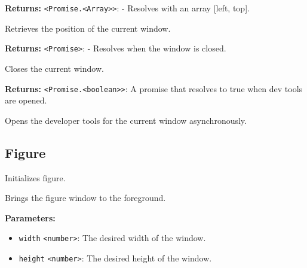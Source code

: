 \documentclass[12pt,a4paper]{article}
\begin{document}
\noindent \textbf{Returns:} \texttt{<Promise.<Array>>}: - Resolves with an array [left, top].

\noindent Retrieves the position of the current window.

\vspace{5mm}
\noindent {}


\noindent \textbf{Returns:} \texttt{<Promise>}: - Resolves when the window is closed.

\noindent Closes the current window.

\vspace{5mm}
\noindent {}


\noindent \textbf{Returns:} \texttt{<Promise.<boolean>>}: A promise that resolves to true when dev tools are opened.

\noindent Opens the developer tools for the current window asynchronously.


\subsection{Figure}
\vspace{5mm}
\noindent {}


\noindent Initializes figure.

\vspace{5mm}
\noindent {}


\noindent Brings the figure window to the foreground.

\vspace{5mm}
\noindent {}


\noindent \textbf{Parameters:}
\begin{itemize}
  \item \texttt{width} \texttt{<number>}: The desired width of the window.
  \item \texttt{height} \texttt{<number>}: The desired height of the window.
\end{itemize}
\end{document}
